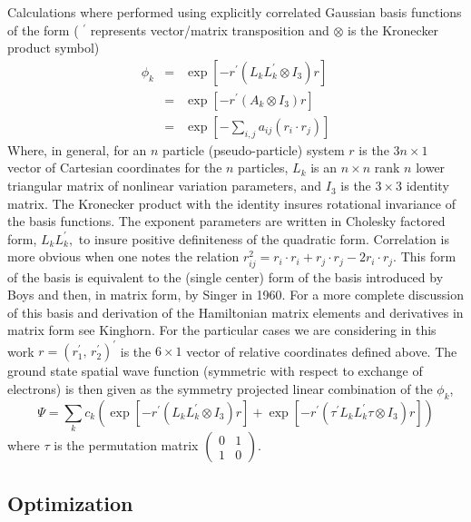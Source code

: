 \documentclass[12pt,thmsa]{article}
\begin{document}
Calculations where performed using explicitly correlated Gaussian basis
functions of the form ( $^{\prime }$ represents vector/matrix transposition
and $\otimes $ is the Kronecker product symbol) 
\begin{eqnarray}
\phi _k &=&\exp \left[ -r^{\prime }\left( L_kL_k^{\prime }\otimes I_3\right)
r\right]   \label{ECG} \\
&=&\exp \left[ -r^{\prime }\left( A_k\otimes I_3\right) r\right]   \nonumber
\\
&=&\exp \left[ -\sum_{i,j}a_{ij}\left( r_i\cdot r_j\right) \right]  
\nonumber
\end{eqnarray}
Where, in general, for an $n$ particle (pseudo-particle) system $r$ is the $%
3n\times 1$ vector of Cartesian coordinates for the $n$ particles, $L_k$ is
an $n\times n$ rank $n$ lower triangular matrix of nonlinear variation
parameters, and $I_3$ is the $3\times 3$ identity matrix. The Kronecker
product with the identity insures rotational invariance of the basis
functions. The exponent parameters are written in Cholesky factored form, $%
L_kL_k^{\prime },$ to insure positive definiteness of the quadratic form. 
Correlation is more obvious when one notes the relation $r_{ij}^2=r_i\cdot
r_i+r_j\cdot r_j-2r_i\cdot r_j.$ This form of the basis is equivalent to the
(single center) form of the basis introduced by Boys\cite{Boys} and then, in
matrix form, by Singer\cite{Singer1} in 1960. For a more complete discussion
of this basis and derivation of the Hamiltonian matrix elements and
derivatives in matrix form see Kinghorn\cite{Kinghorn95a,Kinghorn95b}. For
the particular cases we are considering in this work $r=\left( r_1^{\prime
},\,r_2^{\prime }\right) ^{\prime }$ is the $6\times 1$ vector of relative
coordinates defined above. The ground state spatial wave function (symmetric
with respect to exchange of electrons) is then given as the symmetry
projected linear combination of the $\phi _k$, 
\begin{equation}
\Psi =\sum_kc_k\left( \exp \left[ -r^{\prime }\left( L_kL_k^{\prime }\otimes
I_3\right) r\right] +\exp \left[ -r^{\prime }\left( \tau ^{\prime
}L_kL_k^{\prime }\tau \otimes I_3\right) r\right] \right) 
\end{equation}
where $\tau $ is the permutation matrix $\left( 
\begin{array}{cc}
0 & 1 \\ 
1 & 0
\end{array}
\right) .$  

\subsection{Optimization}
\end{document}
